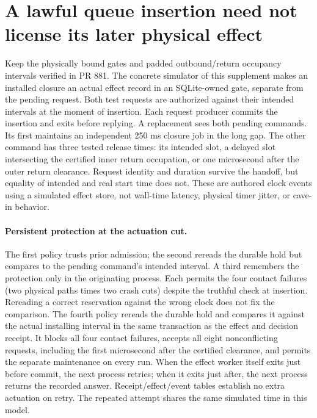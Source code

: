 \documentclass{article}
\begin{document}
\section*{A lawful queue insertion need not license its later physical effect}
Keep the physically bound gates and padded outbound/return occupancy
intervals verified in PR 881. The concrete simulator of this supplement
makes an installed closure an actual effect record in an SQLite-owned
gate, separate from the pending request. Both test requests are
authorized against their intended intervals at the moment of insertion.
Each request producer commits the insertion and exits before replying.
A replacement sees both pending commands. Its first maintains an
independent 250 ms closure job in the long gap. The other command has
three tested release times: its intended slot, a delayed slot intersecting
the certified inner return occupation, or one microsecond after the
outer return clearance. Request identity and duration survive the
handoff, but equality of intended and real start time does not.
These are authored clock events using a simulated effect store, not
wall-time latency, physical timer jitter, or cave-in behavior.

\paragraph{Persistent protection at the actuation cut.}
The first policy trusts prior admission; the second rereads the durable
hold but compares to the pending command's intended interval.
A third remembers the protection only in the originating process.
Each permits the four contact failures (two physical paths times two
crash cuts) despite the truthful check at insertion. Rereading a correct
reservation against the wrong clock does not fix the comparison.
The fourth policy rereads the durable hold and compares it against the
actual installing interval in the same transaction as the effect and
decision receipt. It blocks all four contact failures, accepts all eight
nonconflicting requests, including the first microsecond after the
certified clearance, and permits the separate maintenance on every run.
When the effect worker itself exits just before commit, the next process
retries; when it exits just after, the next process returns the recorded
answer. Receipt/effect/event tables establish no extra actuation on
retry. The repeated attempt shares the same simulated time in this model.
\end{document}

